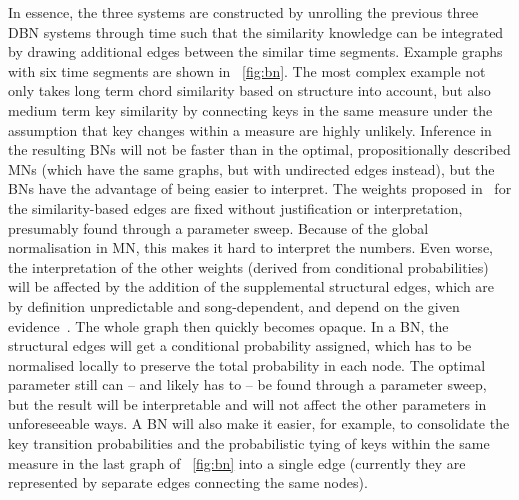\documentclass[letterpaper]{article} %
\newcommand{\figref}[1]{\figurename~\ref{fig:#1}} %
\begin{document}
In essence, the three systems are constructed by unrolling the previous three DBN systems through time such that the similarity knowledge can be integrated by drawing additional edges between the similar time segments. Example graphs with six time segments are shown in \figref{bn}. The most complex example not only takes long term chord similarity based on structure into account, but also medium term key similarity by connecting keys in the same measure under the assumption that key changes within a measure are highly unlikely.  Inference in the resulting BNs will not be faster than in the optimal, propositionally described MNs (which have the same graphs, but with undirected edges instead), but the BNs have the advantage of being easier to interpret. The weights proposed in~\cite{papadopoulos2017taslp} for the similarity-based edges are fixed without justification or interpretation, presumably found through a parameter sweep. Because of the global normalisation in MN, this makes it hard to interpret the numbers. Even worse, the interpretation of the other weights (derived from conditional probabilities) will be affected by the addition of the supplemental structural edges, which are by definition unpredictable and song-dependent, and depend on the given evidence~\cite{jain2011ki}. The whole graph then quickly becomes opaque. In a BN, the structural edges will get a conditional probability assigned, which has to be normalised locally to preserve the total probability in each node. The optimal parameter still can -- and likely has to -- be found through a parameter sweep, but the result will be interpretable and will not affect the other parameters in unforeseeable ways. A BN will also make it easier, for example, to consolidate the key transition probabilities and the probabilistic tying of keys within the same measure in the last graph of \figref{bn} into a single edge (currently they are represented by separate edges connecting the same nodes).








\vspace{-1.07mm}
\end{document}
